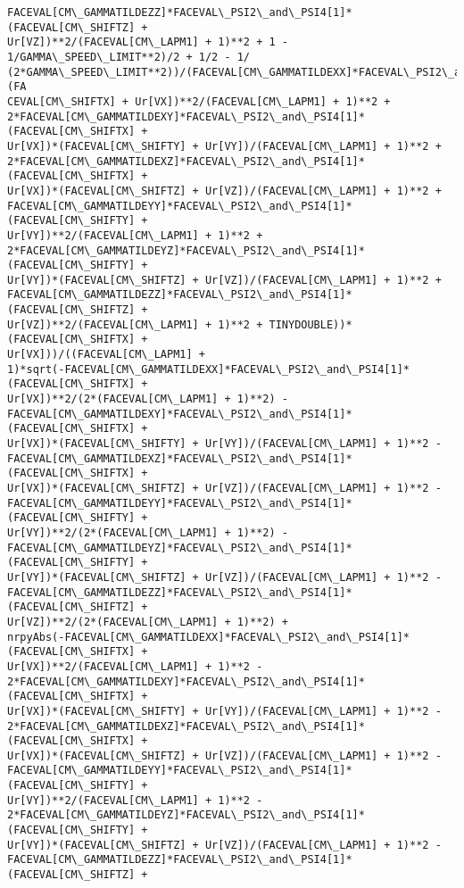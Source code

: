 \documentclass[landscape,letterpaper,10pt,english]{article}
\begin{document}
\begin{Verbatim}[commandchars=\\\{\}]
FACEVAL[CM\_GAMMATILDEZZ]*FACEVAL\_PSI2\_and\_PSI4[1]*(FACEVAL[CM\_SHIFTZ] +
Ur[VZ])**2/(FACEVAL[CM\_LAPM1] + 1)**2 + 1 - 1/GAMMA\_SPEED\_LIMIT**2)/2 + 1/2 - 1/
(2*GAMMA\_SPEED\_LIMIT**2))/(FACEVAL[CM\_GAMMATILDEXX]*FACEVAL\_PSI2\_and\_PSI4[1]*(FA
CEVAL[CM\_SHIFTX] + Ur[VX])**2/(FACEVAL[CM\_LAPM1] + 1)**2 +
2*FACEVAL[CM\_GAMMATILDEXY]*FACEVAL\_PSI2\_and\_PSI4[1]*(FACEVAL[CM\_SHIFTX] +
Ur[VX])*(FACEVAL[CM\_SHIFTY] + Ur[VY])/(FACEVAL[CM\_LAPM1] + 1)**2 +
2*FACEVAL[CM\_GAMMATILDEXZ]*FACEVAL\_PSI2\_and\_PSI4[1]*(FACEVAL[CM\_SHIFTX] +
Ur[VX])*(FACEVAL[CM\_SHIFTZ] + Ur[VZ])/(FACEVAL[CM\_LAPM1] + 1)**2 +
FACEVAL[CM\_GAMMATILDEYY]*FACEVAL\_PSI2\_and\_PSI4[1]*(FACEVAL[CM\_SHIFTY] +
Ur[VY])**2/(FACEVAL[CM\_LAPM1] + 1)**2 +
2*FACEVAL[CM\_GAMMATILDEYZ]*FACEVAL\_PSI2\_and\_PSI4[1]*(FACEVAL[CM\_SHIFTY] +
Ur[VY])*(FACEVAL[CM\_SHIFTZ] + Ur[VZ])/(FACEVAL[CM\_LAPM1] + 1)**2 +
FACEVAL[CM\_GAMMATILDEZZ]*FACEVAL\_PSI2\_and\_PSI4[1]*(FACEVAL[CM\_SHIFTZ] +
Ur[VZ])**2/(FACEVAL[CM\_LAPM1] + 1)**2 + TINYDOUBLE))*(FACEVAL[CM\_SHIFTX] +
Ur[VX]))/((FACEVAL[CM\_LAPM1] +
1)*sqrt(-FACEVAL[CM\_GAMMATILDEXX]*FACEVAL\_PSI2\_and\_PSI4[1]*(FACEVAL[CM\_SHIFTX] +
Ur[VX])**2/(2*(FACEVAL[CM\_LAPM1] + 1)**2) -
FACEVAL[CM\_GAMMATILDEXY]*FACEVAL\_PSI2\_and\_PSI4[1]*(FACEVAL[CM\_SHIFTX] +
Ur[VX])*(FACEVAL[CM\_SHIFTY] + Ur[VY])/(FACEVAL[CM\_LAPM1] + 1)**2 -
FACEVAL[CM\_GAMMATILDEXZ]*FACEVAL\_PSI2\_and\_PSI4[1]*(FACEVAL[CM\_SHIFTX] +
Ur[VX])*(FACEVAL[CM\_SHIFTZ] + Ur[VZ])/(FACEVAL[CM\_LAPM1] + 1)**2 -
FACEVAL[CM\_GAMMATILDEYY]*FACEVAL\_PSI2\_and\_PSI4[1]*(FACEVAL[CM\_SHIFTY] +
Ur[VY])**2/(2*(FACEVAL[CM\_LAPM1] + 1)**2) -
FACEVAL[CM\_GAMMATILDEYZ]*FACEVAL\_PSI2\_and\_PSI4[1]*(FACEVAL[CM\_SHIFTY] +
Ur[VY])*(FACEVAL[CM\_SHIFTZ] + Ur[VZ])/(FACEVAL[CM\_LAPM1] + 1)**2 -
FACEVAL[CM\_GAMMATILDEZZ]*FACEVAL\_PSI2\_and\_PSI4[1]*(FACEVAL[CM\_SHIFTZ] +
Ur[VZ])**2/(2*(FACEVAL[CM\_LAPM1] + 1)**2) +
nrpyAbs(-FACEVAL[CM\_GAMMATILDEXX]*FACEVAL\_PSI2\_and\_PSI4[1]*(FACEVAL[CM\_SHIFTX] +
Ur[VX])**2/(FACEVAL[CM\_LAPM1] + 1)**2 -
2*FACEVAL[CM\_GAMMATILDEXY]*FACEVAL\_PSI2\_and\_PSI4[1]*(FACEVAL[CM\_SHIFTX] +
Ur[VX])*(FACEVAL[CM\_SHIFTY] + Ur[VY])/(FACEVAL[CM\_LAPM1] + 1)**2 -
2*FACEVAL[CM\_GAMMATILDEXZ]*FACEVAL\_PSI2\_and\_PSI4[1]*(FACEVAL[CM\_SHIFTX] +
Ur[VX])*(FACEVAL[CM\_SHIFTZ] + Ur[VZ])/(FACEVAL[CM\_LAPM1] + 1)**2 -
FACEVAL[CM\_GAMMATILDEYY]*FACEVAL\_PSI2\_and\_PSI4[1]*(FACEVAL[CM\_SHIFTY] +
Ur[VY])**2/(FACEVAL[CM\_LAPM1] + 1)**2 -
2*FACEVAL[CM\_GAMMATILDEYZ]*FACEVAL\_PSI2\_and\_PSI4[1]*(FACEVAL[CM\_SHIFTY] +
Ur[VY])*(FACEVAL[CM\_SHIFTZ] + Ur[VZ])/(FACEVAL[CM\_LAPM1] + 1)**2 -
FACEVAL[CM\_GAMMATILDEZZ]*FACEVAL\_PSI2\_and\_PSI4[1]*(FACEVAL[CM\_SHIFTZ] +

\end{Verbatim}
\end{document}
